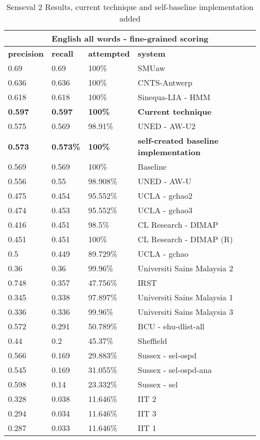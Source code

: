 \begin{table}[htp]
	\begin{tabular}{|l|l|l|l|}
		\hline
		  \multicolumn{4}{|c|}{\bf English all words - fine-grained scoring } \\
		\hline
		{\bf precision } & {\bf recall} & {\bf attempted} & {\bf system} \\ \hline 
		0.69	&	0.69	&	100\%	&		SMUaw \\ \hline
		0.636	&	0.636	&	100\%	&		CNTS-Antwerp \\ \hline
		0.618	&	0.618	&	100\%	&		Sinequa-LIA - HMM \\ \hline
		
		{\bf 0.597} & {\bf 0.597} & {\bf 100\% } &	{\bf Current technique} \\ \hline	
		
		0.575	&	0.569	&	98.91\% &		UNED - AW-U2 \\ \hline
		
		{\bf 0.573} & {\bf 0.573\% } & {\bf 100\%} &	{\bf self-created baseline implementation } \\ \hline
		
		0.569	&	0.569	&	100\%		&	Baseline \\ \hline
		0.556	&	0.55	&	98.908\%	&	UNED - AW-U	 \\ \hline
		0.475	&	0.454	&	95.552\%	&	UCLA - gchao2 \\ \hline
		0.474	&	0.453	&	95.552\%	&	UCLA - gchao3 \\ \hline
		0.416	&	0.451	&	98.5\%		&	CL Research - DIMAP	 \\ \hline
		0.451	&	0.451	&	100\%		&	CL Research - DIMAP (R)	 \\ \hline
		0.5		&	0.449	&	89.729\%	&	UCLA - gchao \\ \hline
		0.36	&	0.36	&	99.96\%		&	Universiti Sains Malaysia 2	 \\ \hline
		0.748	&	0.357	&	47.756\%	&	IRST \\ \hline
		0.345	&	0.338	&	97.897\%	&	Universiti Sains Malaysia 1 \\ \hline
		0.336	&	0.336	&	99.96\%		&	Universiti Sains Malaysia 3 \\ \hline
		0.572	&	0.291	&	50.789\%	&	BCU - ehu-dlist-all \\ \hline
		0.44	&	0.2		&	45.37\%		&	Sheffield \\ \hline
		0.566	&	0.169	&	29.883\%	&	Sussex - sel-ospd \\ \hline
		0.545	&	0.169	&	31.055\%	&	Sussex - sel-ospd-ana \\ \hline
		0.598	&	0.14	&	23.332\%	&	Sussex - sel \\ \hline
		0.328	&	0.038	&	11.646\%	&	IIT 2 \\ \hline
		0.294	&	0.034	&	11.646\%	&	IIT 3 \\ \hline
		0.287	&	0.033	&	11.646\%	&	IIT 1 \\ \hline
	\end{tabular}
	\caption{Senseval 2 Results, current technique and self-baseline implementation added}
	\label{table:SENSEVAL2RESULTS}
\end{table}

